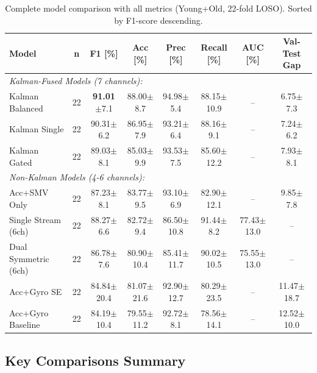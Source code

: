 \documentclass{article}
\begin{document}
\begin{table}[htbp]
    \centering
    \caption{Complete model comparison with all metrics (Young+Old, 22-fold LOSO). Sorted by F1-score descending.}
    \label{tab:master_comparison}
    \small
    \begin{tabular}{lccccccc}
        \toprule
        \textbf{Model} & \textbf{n} & \textbf{F1 [\%]} & \textbf{Acc [\%]} & \textbf{Prec [\%]} & \textbf{Recall [\%]} & \textbf{AUC [\%]} & \textbf{Val-Test Gap} \\
        \midrule
        \multicolumn{8}{l}{\textit{Kalman-Fused Models (7 channels):}} \\
        Kalman Balanced & 22 & \textbf{91.01}$\pm$7.1 & 88.00$\pm$8.7 & 94.98$\pm$5.4 & 88.15$\pm$10.9 & -- & 6.75$\pm$7.3 \\
        Kalman Single & 22 & 90.31$\pm$6.2 & 86.95$\pm$7.9 & 93.21$\pm$6.4 & 88.16$\pm$9.1 & -- & 7.24$\pm$6.2 \\
        Kalman Gated & 22 & 89.03$\pm$8.1 & 85.03$\pm$9.9 & 93.53$\pm$7.5 & 85.60$\pm$12.2 & -- & 7.93$\pm$8.1 \\
        \midrule
        \multicolumn{8}{l}{\textit{Non-Kalman Models (4-6 channels):}} \\
        Acc+SMV Only & 22 & 87.23$\pm$8.1 & 83.77$\pm$9.5 & 93.10$\pm$6.9 & 82.90$\pm$12.1 & -- & 9.85$\pm$7.8 \\
        Single Stream (6ch) & 22 & 88.27$\pm$6.6 & 82.72$\pm$9.4 & 86.50$\pm$10.8 & 91.44$\pm$8.2 & 77.43$\pm$13.0 & -- \\
        Dual Symmetric (6ch) & 22 & 86.78$\pm$7.6 & 80.90$\pm$10.4 & 85.41$\pm$11.7 & 90.02$\pm$10.5 & 75.55$\pm$13.0 & -- \\
        Acc+Gyro SE & 22 & 84.84$\pm$20.4 & 81.07$\pm$21.6 & 92.90$\pm$12.7 & 80.29$\pm$23.5 & -- & 11.47$\pm$18.7 \\
        Acc+Gyro Baseline & 22 & 84.19$\pm$10.4 & 79.55$\pm$11.2 & 92.72$\pm$8.1 & 78.56$\pm$14.1 & -- & 12.52$\pm$10.0 \\
        \bottomrule
    \end{tabular}
\end{table}

\subsection{Key Comparisons Summary}
\end{document}
